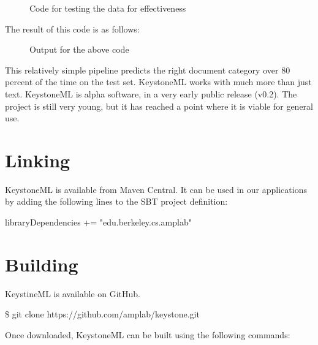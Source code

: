 \documentclass[9pt,twocolumn,twoside]{../../styles/osajnl}
\begin{document}
\begin{figure}[htbp]
\centering
{}
\caption{Code for testing the data for effectiveness}
\label{fig:Code for testing the data for effectiveness}
\end{figure}


The result of this code is as follows:

\begin{figure}[htbp]
\centering
{}
\caption{Output for the above code}
\label{fig:Output for the above code}
\end{figure}

This relatively simple pipeline predicts the right document category
over 80 percent of the time on the test set. KeystoneML works with
much more than just text. KeystoneML is alpha software, in a very
early public release (v0.2). The project is still very young, but it
has reached a point where it is viable for general use.

\section{Linking}

KeystoneML is available from Maven Central. It can be used in our
applications by adding the following lines to the SBT project
definition:

libraryDependencies += "edu.berkeley.cs.amplab" %



\section{Building}

KeystineML is available on GitHub.

\$ git clone https://github.com/amplab/keystone.git

Once downloaded, KeystoneML can be built using the following commands:
\end{document}
